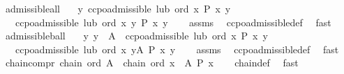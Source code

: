 \begin{isabellebody}
\ admissible{\isacharunderscore}{\kern0pt}all{\isacharcolon}{\kern0pt}\isanewline
\ \ \ {\isachardoublequoteopen}{\isasymAnd}y{\isachardot}{\kern0pt}\ ccpo{\isachardot}{\kern0pt}admissible\ lub\ ord\ {\isacharparenleft}{\kern0pt}{\isasymlambda}x{\isachardot}{\kern0pt}\ P\ x\ y{\isacharparenright}{\kern0pt}{\isachardoublequoteclose}\isanewline
\ \ \ {\isachardoublequoteopen}ccpo{\isachardot}{\kern0pt}admissible\ lub\ ord\ {\isacharparenleft}{\kern0pt}{\isasymlambda}x{\isachardot}{\kern0pt}\ {\isasymforall}y{\isachardot}{\kern0pt}\ P\ x\ y{\isacharparenright}{\kern0pt}{\isachardoublequoteclose}\isanewline
%
\isadelimproof
\ \ %
\endisadelimproof
%
\isatagproof
{}\isamarkupfalse%
\ assms\ \isamarkupfalse%
\ ccpo{\isachardot}{\kern0pt}admissible{\isacharunderscore}{\kern0pt}def\ \isamarkupfalse%
\ fast%
\endisatagproof
{\isafoldproof}%
%
\isadelimproof
\isanewline
%
\endisadelimproof
\isanewline
{}\isamarkupfalse%
\ admissible{\isacharunderscore}{\kern0pt}ball{\isacharcolon}{\kern0pt}\isanewline
\ \ \ {\isachardoublequoteopen}{\isasymAnd}y{\isachardot}{\kern0pt}\ y\ {\isasymin}\ A\ {\isasymLongrightarrow}\ ccpo{\isachardot}{\kern0pt}admissible\ lub\ ord\ {\isacharparenleft}{\kern0pt}{\isasymlambda}x{\isachardot}{\kern0pt}\ P\ x\ y{\isacharparenright}{\kern0pt}{\isachardoublequoteclose}\isanewline
\ \ \ {\isachardoublequoteopen}ccpo{\isachardot}{\kern0pt}admissible\ lub\ ord\ {\isacharparenleft}{\kern0pt}{\isasymlambda}x{\isachardot}{\kern0pt}\ {\isasymforall}y{\isasymin}A{\isachardot}{\kern0pt}\ P\ x\ y{\isacharparenright}{\kern0pt}{\isachardoublequoteclose}\isanewline
%
\isadelimproof
\ \ %
\endisadelimproof
%
\isatagproof
{}\isamarkupfalse%
\ assms\ \isamarkupfalse%
\ ccpo{\isachardot}{\kern0pt}admissible{\isacharunderscore}{\kern0pt}def\ \isamarkupfalse%
\ fast%
\endisatagproof
{\isafoldproof}%
%
\isadelimproof
\isanewline
%
\endisadelimproof
\isanewline
{}\isamarkupfalse%
\ chain{\isacharunderscore}{\kern0pt}compr{\isacharcolon}{\kern0pt}\ {\isachardoublequoteopen}chain\ ord\ A\ {\isasymLongrightarrow}\ chain\ ord\ {\isacharbraceleft}{\kern0pt}x\ {\isasymin}\ A{\isachardot}{\kern0pt}\ P\ x{\isacharbraceright}{\kern0pt}{\isachardoublequoteclose}\isanewline
%
\isadelimproof
\ \ %
\endisadelimproof
%
\isatagproof
{}\isamarkupfalse%
\ chain{\isacharunderscore}{\kern0pt}def\ \isamarkupfalse%
\ fast%
\endisatagproof

\end{isabellebody}
